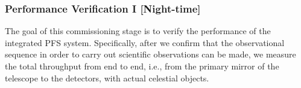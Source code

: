 \subsubsection{Performance Verification I [Night-time]}\label{secflow:PV1}



The goal of this commissioning stage is to verify the performance of the integrated PFS system. 
Specifically, after we confirm that the observational sequence in order to carry out scientific observations can be made, we measure the total throughput from end to end, i.e., from the primary mirror of the telescope to the detectors, with actual celestial objects. 

